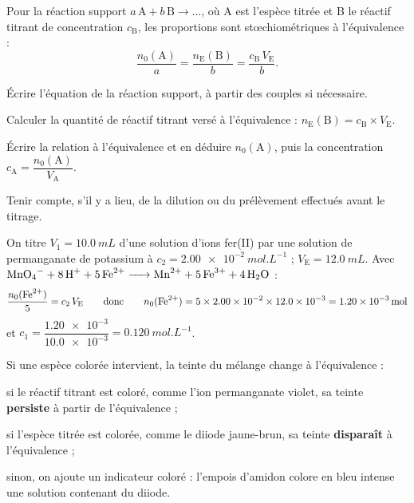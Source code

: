 \begin{propriete}
Pour la réaction support $a\,\mathrm{A}+b\,\mathrm{B}\longrightarrow\dots$, où A est l'espèce titrée et B le réactif titrant de concentration $c_\mathrm{B}$,
les proportions sont stœchiométriques à l'équivalence :
\[\frac{n_0(\mathrm{A})}{a}=\frac{n_\mathrm{E}(\mathrm{B})}{b}=\frac{c_\mathrm{B}\,V_\mathrm{E}}{b}.\]
\end{propriete}
\begin{savoirfaire}
\begin{questions}
\item Écrire l'équation de la réaction support, à partir des couples si nécessaire.
\item Calculer la quantité de réactif titrant versé à l'équivalence : $n_\mathrm{E}(\mathrm{B})=c_\mathrm{B}\times V_\mathrm{E}$.
\item Écrire la relation à l'équivalence et en déduire $n_0(\mathrm{A})$, puis la concentration $c_\mathrm{A}=\dfrac{n_0(\mathrm{A})}{V_\mathrm{A}}$.
\item Tenir compte, s'il y a lieu, de la dilution ou du prélèvement effectués avant le titrage.
\end{questions}
\end{savoirfaire}
\begin{exemple}
On titre $V_1=\qty{10,0}{mL}$ d'une solution d'ions fer(II) par une solution de permanganate de potassium à
$c_2=\qty{2,00e-2}{mol.L^{-1}}$ ; $V_\mathrm{E}=\qty{12,0}{mL}$. Avec $\ce{MnO4- + 8H+ + 5Fe^{2+} -> Mn^{2+} + 5Fe^{3+} + 4H2O}$ :
\[\frac{n_0(\ce{Fe^{2+}})}{5}=c_2\,V_\mathrm{E}\qquad\text{donc}\qquad n_0(\ce{Fe^{2+}})=5\times\num{2.00e-2}\times\num{12.0e-3}=\qty{1,20e-3}{mol}\]
et $c_1=\dfrac{\num{1.20e-3}}{\num{10.0e-3}}=\qty{0,120}{mol.L^{-1}}$.
\end{exemple}
\begin{propriete}
Si une espèce colorée intervient, la teinte du mélange change à l'équivalence :
\begin{questions}
\item si le réactif titrant est coloré, comme l'ion permanganate violet, sa teinte \textbf{persiste} à partir de l'équivalence ;
\item si l'espèce titrée est colorée, comme le diiode jaune-brun, sa teinte \textbf{disparaît} à l'équivalence ;
\item sinon, on ajoute un indicateur coloré : l'empois d'amidon colore en bleu intense une solution contenant du diiode.
\end{questions}
\end{propriete}
